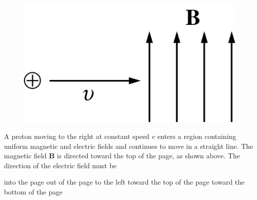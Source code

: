 \begin{figure}[H]
    \center
    \includegraphics[scale=0.25]{images/img-004-011.png}
\end{figure}

\begin{questions}\setcounter{question}{8}\question
A proton moving to the right at constant speed $v$ enters a region containing uniform magnetic and electric fields and continues to move in a straight line. The magnetic field $\mathbf{B}$ is directed toward the top of the page, as shown above. The direction of the electric field must be

\begin{choices}
\choice into the page
\choice out of the page
\choice to the left
\choice toward the top of the page
\choice toward the bottom of the page
\end{choices}\end{questions}

